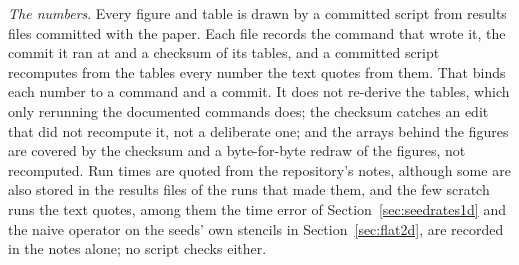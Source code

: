 \documentclass[11pt]{amsart}
\theoremstyle{definition}
\theoremstyle{remark}
\newcommand{\para}[1]{\par\smallskip\noindent\textit{#1}.\enspace}
\begin{document}
\para{The numbers}
Every figure and table is drawn by a committed script from results files
committed with the paper. Each file records the command that wrote it, the
commit it ran at and a checksum of its tables, and a committed script
recomputes from the tables every number the text quotes from them. That
binds each number to a command and a commit. It does not re-derive the
tables, which only rerunning the documented commands does; the checksum
catches an edit that did not recompute it, not a deliberate one; and the
arrays behind the figures are covered by the checksum and a byte-for-byte
redraw of the figures, not recomputed. Run times are quoted from the
repository's notes, although some are also stored in the results files of
the runs that made them, and the few scratch runs the text quotes, among
them the time error of Section~\ref{sec:seedrates1d} and the naive
operator on the seeds' own stencils in Section~\ref{sec:flat2d}, are
recorded in the notes alone; no script checks either.
\end{document}
